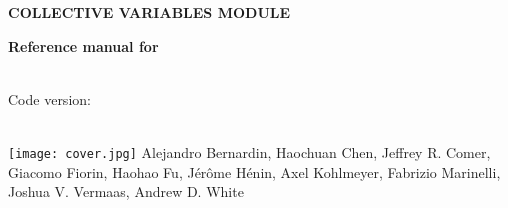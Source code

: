 \documentclass[11pt]{article}
\begin{document}
\ifdefined\HCode

\fi



\ifdefined\HCode
{}
\fi

\begin{titlepage}

  \noindent\colorbox{background-color}{
    \begin{minipage}{1.0\textwidth}

        $\,$\\
        
        \noindent\textsf{\bfseries\Huge COLLECTIVE VARIABLES MODULE\\}
        
        \noindent\textsf{\bfseries\Huge Reference manual for \MDENGINE{} }

        \noindent\textsf{\\Code version: \cvversion\\}

      \end{minipage}}

  \ifdefined\HCode
  \\
  \else
  \texttt{[image: cover.jpg]}
  \fi
  \textsf{\large Alejandro Bernardin, Haochuan Chen, Jeffrey R.{} Comer, Giacomo Fiorin, Haohao Fu, J\'er\^ome H\'enin, Axel Kohlmeyer, Fabrizio Marinelli, Joshua V.{} Vermaas, Andrew D.{} White}
\end{titlepage}

\newpage
\tableofcontents
\newpage


\newcommand{\key}[5]{%
  \index{#2!\texttt{#1}}
  {\bf Keyword \large \tt #1} $\langle\,$#3$\,\rangle$ \\%
  {\bf Context: } #2 \\%
  {\bf Acceptable values: } #4 \\%
  {\bf Description: } #5%
}
\newcommand{\keydef}[6]{%
  \index{#2!\texttt{#1}}
  {\bf Keyword \large \tt #1} $\langle\,$#3$\,\rangle$ \\%
  {\bf Context: } #2 \\%
  {\bf Acceptable values: } #4 \\%
  {\bf Default value: } #5 \\%
  {\bf Description: } #6
}
\newcommand{\labelkey}[1]{\hypertarget{#1}{}\label{#1}}
\newcommand{\refkey}[2]{\hyperlink{#2}{\texttt{#1}}}
\newcommand{\dupkey}[4]{%
  \index{#2!\texttt{#1}}
  {\bf Keyword \large \tt #1:} see definition of \hyperlink{#3}{\texttt{#1}} in sec.~\ref{#3} (#4)%
}
\newcommand{\simkey}[3]{%
  \index{#2!\texttt{#1}}
  {\bf Keyword \large \tt #1:} analogous to \texttt{#3}%
}
\end{document}
